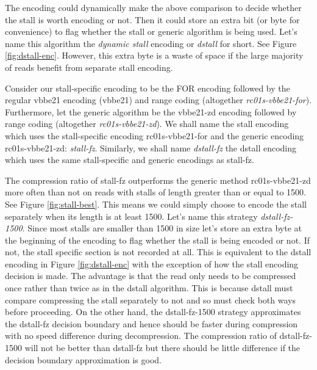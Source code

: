 

The encoding could dynamically make the above comparison to decide
whether the stall is worth encoding or not. Then it could store an extra bit (or
byte for convenience) to flag whether the stall or generic algorithm is being
used. Let's name this algorithm the \textit{dynamic stall} encoding or
\textit{dstall} for short. See Figure \ref{fig:dstall-enc}. However, this extra
byte is a waste of space if the large majority of reads benefit from separate
stall encoding.



Consider our stall-specific encoding to be the FOR encoding followed by the
regular vbbe21 encoding (vbbe21) and range coding (altogether
\textit{rc01s-vbbe21-for}). Furthermore, let the generic algorithm be the
vbbe21-zd encoding followed by range coding (altogether
\textit{rc01s-vbbe21-zd}).
We shall name the stall encoding which uses the stall-specific encoding
rc01s-vbbe21-for and the generic encoding rc01s-vbbe21-zd: \textit{stall-fz}.
Similarly, we shall name \textit{dstall-fz} the dstall encoding which uses the
same stall-specific and generic encodings as stall-fz.

The compression ratio of stall-fz outperforms the generic method rc01s-vbbe21-zd
more often than not on reads with stalls of length greater than or equal to
1500. See Figure
\ref{fig:stall-best}. This means we could simply choose to encode the stall
separately when its length is at least 1500. Let's name this strategy
\textit{dstall-fz-1500}. Since most stalls are smaller than
1500 in size let's store an extra byte at the beginning of the encoding to flag
whether the stall is being encoded or not. If not, the stall specific section is
not recorded at all. This is equivalent to the dstall encoding in Figure
\ref{fig:dstall-enc} with the exception of how the stall encoding decision is
made. The advantage is that the read only needs to be compressed once rather
than twice as in the dstall algorithm. This is because dstall must compare
compressing the stall separately to not and so must check both ways before
proceeding. On the other hand, the dstall-fz-1500 strategy approximates the
dstall-fz decision boundary and hence should be faster during compression with
no speed difference during decompression. The compression ratio of
dstall-fz-1500 will not be better than dstall-fz but there should be little
difference if the decision boundary approximation is good.

%


